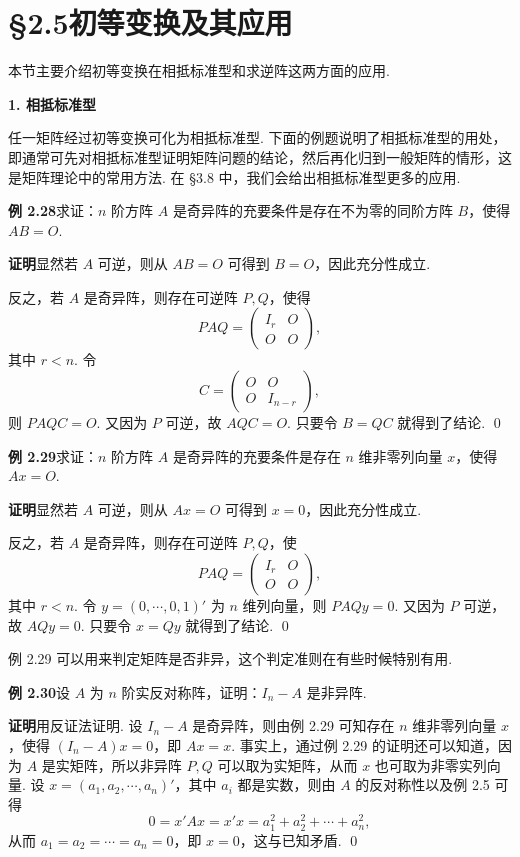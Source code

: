 \documentclass[UTF8, 12pt, fontset=fandol, oneside]{ctexart}
\begin{document}
\section*{§2.5\quad 初等变换及其应用}

本节主要介绍初等变换在相抵标准型和求逆阵这两方面的应用.

\noindent\textbf{1. 相抵标准型}

任一矩阵经过初等变换可化为相抵标准型. 下面的例题说明了相抵标准型的用处，即通常可先对相抵标准型证明矩阵问题的结论，然后再化归到一般矩阵的情形，这是矩阵理论中的常用方法. 在 §3.8 中，我们会给出相抵标准型更多的应用.

\noindent\textbf{例 2.28}\quad 求证：$n$ 阶方阵 $A$ 是奇异阵的充要条件是存在不为零的同阶方阵 $B$，使得 $AB=O$.

\noindent\textbf{证明}\quad 显然若 $A$ 可逆，则从 $AB=O$ 可得到 $B=O$，因此充分性成立.

反之，若 $A$ 是奇异阵，则存在可逆阵 $P,Q$，使得
\[
PAQ=
\left(
\begin{array}{cc}
I_r & O\\
O & O
\end{array}
\right),
\]
其中 $r<n$. 令
\[
C=
\left(
\begin{array}{cc}
O & O\\
O & I_{n-r}
\end{array}
\right),
\]
则 $PAQC=O$. 又因为 $P$ 可逆，故 $AQC=O$. 只要令 $B=QC$ 就得到了结论. \qed

\noindent\textbf{例 2.29}\quad 求证：$n$ 阶方阵 $A$ 是奇异阵的充要条件是存在 $n$ 维非零列向量 $x$，使得 $Ax=O$.

\noindent\textbf{证明}\quad 显然若 $A$ 可逆，则从 $Ax=O$ 可得到 $x=0$，因此充分性成立.

反之，若 $A$ 是奇异阵，则存在可逆阵 $P,Q$，使
\[
PAQ=
\left(
\begin{array}{cc}
I_r & O\\
O & O
\end{array}
\right),
\]
其中 $r<n$. 令 $y=(0,\cdots,0,1)'$ 为 $n$ 维列向量，则 $PAQy=0$. 又因为 $P$ 可逆，故 $AQy=0$. 只要令 $x=Qy$ 就得到了结论. \qed

例 2.29 可以用来判定矩阵是否非异，这个判定准则在有些时候特别有用.

\noindent\textbf{例 2.30}\quad 设 $A$ 为 $n$ 阶实反对称阵，证明：$I_n-A$ 是非异阵.

\noindent\textbf{证明}\quad 用反证法证明. 设 $I_n-A$ 是奇异阵，则由例 2.29 可知存在 $n$ 维非零列向量 $x$，使得 $(I_n-A)x=0$，即 $Ax=x$. 事实上，通过例 2.29 的证明还可以知道，因为 $A$ 是实矩阵，所以非异阵 $P,Q$ 可以取为实矩阵，从而 $x$ 也可取为非零实列向量. 设 $x=(a_1,a_2,\cdots,a_n)'$，其中 $a_i$ 都是实数，则由 $A$ 的反对称性以及例 2.5 可得
\[
0=x'Ax=x'x=a_1^2+a_2^2+\cdots+a_n^2,
\]
从而 $a_1=a_2=\cdots=a_n=0$，即 $x=0$，这与已知矛盾. \qed
\end{document}
